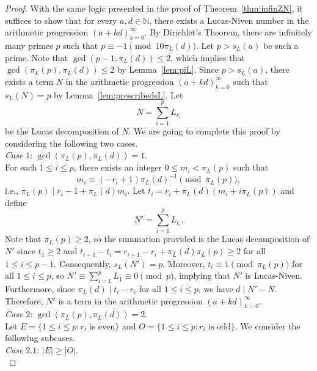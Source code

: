 \documentclass[10pt,a4paper]{amsart}
\newcommand{\N}{\mathbb{N}}
\begin{document}
\begin{proof}
With the same logic presented in the proof of Theorem~\ref{thm:infinZN}, it suffices to show that for every $a,d\in\N$, there exists a Lucas-Niven number in the arithmetic progression $(a+kd)_{k=0}^\infty$. By Dirichlet's Theorem, there are infinitely many primes $p$ such that $p\equiv-1\pmod{10\pi_L(d)}$. Let $p>s_L(a)$ be such a prime. Note that $\gcd(p-1,\pi_L(d))\leq2$, which implies that $\gcd(\pi_L(p),\pi_L(d))\leq2$ by Lemma~\ref{lem:piL}. Since $p>s_L(a)$, there exists a term $N$ in the arithmetic progression $(a+kd)_{k=0}^\infty$ such that $s_L(N)=p$ by Lemma~\ref{lem:prescribedsL}. Let
\[N=\sum_{i=1}^pL_{r_i}\]
be the Lucas decomposition of $N$. We are going to complete this proof by considering the following two cases.\\

\noindent\textit{Case $1$}: $\gcd(\pi_L(p),\pi_L(d))=1$.\\

For each $1\leq i\leq p$, there exists an integer $0\leq m_i<\pi_L(p)$ such that
\[m_i\equiv(-r_i+1)\pi_L(d)^{-1}\pmod{\pi_L(p)},\]
i.e., $\pi_L(p)\mid r_i-1+\pi_L(d)m_i$. Let $t_i=r_i+\pi_L(d)(m_i+i\pi_L(p))$ and define
\[N'=\sum_{i=1}^pL_{t_i}.\]
Note that $\pi_L(p)\geq2$, so the summation provided is the Lucas decomposition of $N'$ since $t_1\geq2$ and $t_{i+1}-t_i=r_{i+1}-r_i+\pi_L(d)\pi_L(p)\geq2$ for all $1\leq i\leq p-1$. Consequently, $s_L(N')=p$. Moreover, $t_i\equiv 1\pmod{\pi_L(p)}$ for all $1\leq i\leq p$, so $N'\equiv\sum_{i=1}^pL_1\equiv0\pmod{p}$, implying that $N'$ is Lucas-Niven. Furthermore, since $\pi_L(d)\mid t_i-r_i$ for all $1\leq i\leq p$, we have $d\mid N'-N$. Therefore, $N'$ is a term in the arithmetic progression $(a+kd)_{k=0}^\infty$.\\

\noindent\textit{Case $2$}: $\gcd(\pi_L(p),\pi_L(d))=2$.\\

Let $E=\{1\leq i\leq p:r_i\text{ is even}\}$ and $O=\{1\leq i\leq p:r_i\text{ is odd}\}$. We consider the following subcases.\\

\noindent\textit{Case $2.1$}: $|E|\geq|O|$.\\


\end{proof}
\end{document}
